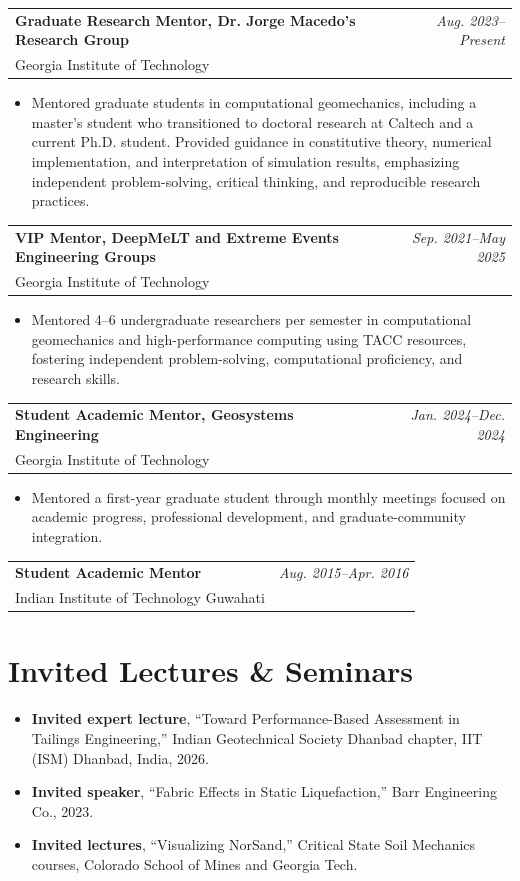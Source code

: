 \documentclass[10pt,letterpaper]{article}
\makeatletter
\newcommand{\entry}[3]{%
  \begin{tabularx}{\textwidth}{@{}X r@{}}
    \textbf{#1} & \textit{#3}\\[-1pt]
    \textcolor{midgray}{#2} &
  \end{tabularx}\vspace{-1pt}
}
\makeatother
\begin{document}
\entry{Graduate Research Mentor, Dr. Jorge Macedo's Research Group}
{Georgia Institute of Technology}{Aug. 2023--Present}
\begin{itemize}
    \item Mentored graduate students in computational
    geomechanics, including a master's student who
    transitioned to doctoral research at Caltech
    and a current Ph.D. student. Provided guidance
    in constitutive theory, numerical implementation,
    and interpretation of simulation results,
    emphasizing independent problem-solving,
    critical thinking, and reproducible research
    practices.
\end{itemize}


\entry{VIP Mentor, DeepMeLT and Extreme Events Engineering Groups}{Georgia Institute of Technology}{Sep. 2021--May 2025}
\begin{itemize}
    \item Mentored 4--6 undergraduate researchers per semester
    in computational geomechanics
    and high-performance computing using TACC resources,
    fostering independent problem-solving, computational
    proficiency, and research skills.
\end{itemize}

\vspace{2pt}
\entry{Student Academic Mentor, Geosystems Engineering}{Georgia Institute of Technology}{Jan. 2024--Dec. 2024}
\begin{itemize}
    \item Mentored a first-year graduate student through monthly meetings focused on academic progress, professional development, and graduate-community integration.
\end{itemize}

\vspace{2pt}
\entry{Student Academic Mentor}{Indian Institute of Technology Guwahati}{Aug. 2015--Apr. 2016}

\section{Invited Lectures \& Seminars}
\begin{itemize}
    \item \textbf{Invited expert lecture}, ``Toward Performance-Based Assessment in Tailings Engineering,'' Indian Geotechnical Society Dhanbad chapter, IIT (ISM) Dhanbad, India, 2026.

    \item \textbf{Invited speaker}, ``Fabric Effects in Static Liquefaction,'' Barr Engineering Co., 2023.

    \item \textbf{Invited lectures}, ``Visualizing NorSand,'' Critical State Soil Mechanics courses, Colorado School of Mines and Georgia Tech.
\end{itemize}
\end{document}
